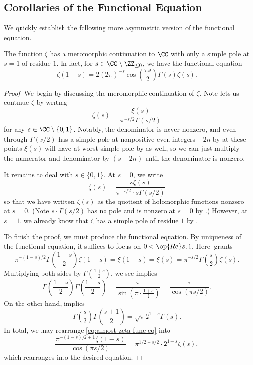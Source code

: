\documentclass[../notes.tex]{subfiles}
\begin{document}
\subsection{Corollaries of the Functional Equation}
We quickly establish the following more asymmetric version of the functional equation.
\begin{corollary}
	The function $\zeta$ has a meromorphic continuation to $\CC$ with only a simple pole at $s=1$ of residue $1$. In fact, for $s\in\CC\setminus\ZZ_{\le0}$, we have the functional equation
	\[\zeta(1-s)=2(2\pi)^{-s}\cos\left(\frac{\pi s}2\right)\Gamma(s)\zeta(s).\]
\end{corollary}
\begin{proof}
	We begin by discussing the meromorphic continuation of $\zeta$. Note  lets us continue $\zeta$ by writing
	\[\zeta(s)=\frac{\xi(s)}{\pi^{-s/2}\Gamma(s/2)}\]
	for any $s\in\CC\setminus\{0,1\}$. Notably, the denominator is never nonzero, and even through $\Gamma(s/2)$ has a simple pole at nonpositive even integers $-2n$ by  at these points $\xi(s)$ will have at worst simple pole by  as well, so we can just multiply the numerator and denominator by $(s-2n)$ until the denominator is nonzero.

	It remains to deal with $s\in\{0,1\}$. At $s=0$, we write
	\[\zeta(s)=\frac{s\xi(s)}{\pi^{-s/2}\cdot s\Gamma(s/2)}\]
	so that we have written $\zeta(s)$ as the quotient of holomorphic functions nonzero at $s=0$. (Note $s\cdot\Gamma(s/2)$ has no pole and is nonzero at $s=0$ by .) However, at $s=1$, we already know that $\zeta$ has a simple pole of residue $1$ by .

	To finish the proof, we must produce the functional equation. By uniqueness of the functional equation, it suffices to focus on $0<\op{Re}s,1$. Here,  grants
	\begin{equation}
		\pi^{-(1-s)/2}\Gamma\left(\frac{1-s}2\right)\zeta(1-s)=\xi(1-s)=\xi(s)=\pi^{-s/2}\Gamma\left(\frac s2\right)\zeta(s). \label{eq:almost-zeta-func-eq}
	\end{equation}
	Multiplying both sides by $\Gamma\left(\frac{1+s}2\right)$, we see  implies
	\[\Gamma\left(\frac{1+s}2\right)\Gamma\left(\frac{1-s}2\right)=\frac\pi{\sin\left(\pi\cdot\frac{1+s}2\right)}=\frac\pi{\cos(\pi s/2)}.\]
	On the other hand,  implies
	\[\Gamma\left(\frac s2\right)\Gamma\left(\frac{s+1}2\right)=\sqrt\pi2^{1-s}\Gamma(s).\]
	In total, we may rearrange \eqref{eq:almost-zeta-func-eq} into
	\[\frac{\pi^{-(1-s)/2+1}\zeta(1-s)}{\cos(\pi s/2)}=\pi^{1/2-s/2}\cdot 2^{1-s}\zeta(s),\]
	which rearranges into the desired equation.
\end{proof}
\end{document}
